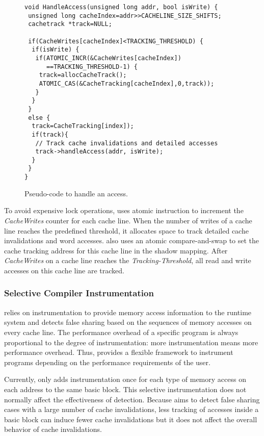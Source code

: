 \begin{figure}[!t]
\begin{lstlisting}
void HandleAccess(unsigned long addr, bool isWrite) {
 unsigned long cacheIndex=addr>>CACHELINE_SIZE_SHIFTS;
 cachetrack *track=NULL;

 if(CacheWrites[cacheIndex]<TRACKING_THRESHOLD) {
  if(isWrite) {
   if(ATOMIC_INCR(&CacheWrites[cacheIndex]) 
      ==TRACKING_THRESHOLD-1) {
    track=allocCacheTrack();
    ATOMIC_CAS(&CacheTracking[cacheIndex],0,track));
   }
  } 
 }
 else {
  track=CacheTracking[index]);
  if(track){
   // Track cache invalidations and detailed accesses
   track->handleAccess(addr, isWrite);
  }
 }
}
\end{lstlisting}
\caption{Pseudo-code to handle an access.\label{fig:algorithm}}
\end{figure}

To avoid expensive lock operations, \Predator{} uses atomic instruction to increment 
the {\it CacheWrites} counter for each cache line. 
When the number of writes of a cache line reaches the predefined threshold,
it allocates space to track detailed cache invalidations and word accesses.
\Predator{} also 
uses an atomic compare-and-swap to set the cache tracking address for this cache line in
the shadow mapping.
After {\it CacheWrites} on a cache line reaches the {\it Tracking-Threshold}, 
all read and write accesses on this cache line are tracked.


\subsubsection{Selective Compiler Instrumentation}
\label{sec:selectinstrumentation}

\Predator{} relies on instrumentation to provide memory access information to the runtime system 
and detects false sharing based on the sequences of memory accesses on every cache line. 
The performance overhead of a specific program is always proportional to 
the degree of instrumentation: more 
instrumentation means more performance overhead. 
Thus, \Predator{} provides a flexible framework to instrument programs 
depending on the performance requirements of the user.

Currently, \Predator{} only adds instrumentation once for each type of memory access on each address 
to the same basic block. 
This selective instrumentation does not normally affect the effectiveness of detection. 
Because \Predator{} aims to detect false sharing cases with a large number of cache invalidations,
less tracking of accesses inside a basic block can induce fewer cache invalidations 
but it does not affect the overall behavior of cache invalidations. 


